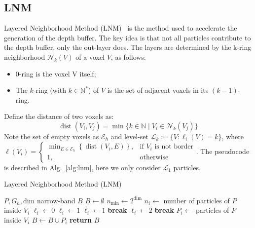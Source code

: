 \documentclass[sigconf]{acmart}
\begin{document}
\subsection{LNM}
Layered Neighborhood Method (LNM)~\cite{oliveira2022narrow} is the method used to accelerate the generation of the depth buffer. The key idea is that not all particles contribute to the depth buffer, only the out-layer does. The layers are determined by the k-ring neighborhood $\mathcal N_k(V)$ of a voxel $V$, as follows:
\begin{itemize}
    \item 0-ring is the voxel V itself;
    \item  The $k$-ring (with $k \in \mathbb N^*$) of $V$ is the set of adjacent voxels in its $(k-1)$-ring.
\end{itemize}
Define the distance of two voxels as:
\begin{equation}
\operatorname{dist}(V_i,V_j)=\min\{k\in\mathbb{N}\mid V_i\in\mathcal{N}_k(V_j)\}
\end{equation}
Note the set of empty voxels as $\mathcal{E}_h$ and level-set $\mathcal L_k:=\{V:\ell_i(V)=k\}$, where $\ell(V_i)=\begin{cases}\min_{E\in\mathcal{E}_h}\left\{\operatorname{dist}(V_i,E)\right\},&\text{if }V_i\text{ is not border}\\1,&\text{otherwise}\end{cases}.$ The pseudocode is described in Alg.~\ref{alg:lnm}, here we only consider $\mathcal L_1$ particles.

\begin{algorithm}
\caption{Layered Neighborhood Method (LNM)}
\begin{algorithmic}[1]
\Require $P, G_h, \text{dim}$
\Ensure narrow-band $B$
\State $B \leftarrow \emptyset$
\State $n_{\text{min}} \leftarrow 2^{\text{dim}}$
    \State $n_i \leftarrow$ number of particles of $P$ inside $V_i$
    \State $\ell_i \leftarrow 0$
\EndFor
{} 
     
        \State $\ell_i \leftarrow 1$
    \Else
             
                \State $\ell_i \leftarrow 1$
                \State \textbf{break}
            \EndIf
        \EndFor
    \EndIf
\EndFor
{} 
                \State $\ell_i \leftarrow 2$
                \State \textbf{break}
            \EndIf
        \EndFor
    \EndIf
\EndFor
{}
        \State $P_i \leftarrow$ particles of $P$ inside $V_i$
        \State $B \leftarrow B \cup P_i$
    \EndIf
\EndFor
\State \textbf{return} $B$
\end{algorithmic}
\label{alg:lnm}
\end{algorithm}
\end{document}
